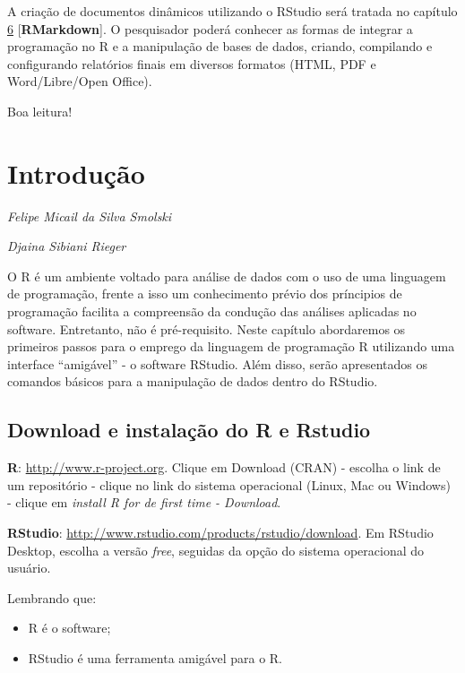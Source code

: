 \documentclass[12pt,portuguese,oneside]{book}
\providecommand{\tightlist}{%
  \setlength{\itemsep}{0pt}\setlength{\parskip}{0pt}}
\begin{document}
A criação de documentos dinâmicos utilizando o RStudio será tratada no
capítulo \protect\hyperlink{rmark}{6} {[}\textbf{RMarkdown}{]}. O
pesquisador poderá conhecer as formas de integrar a programação no R e a
manipulação de bases de dados, criando, compilando e configurando
relatórios finais em diversos formatos (HTML, PDF e Word/Libre/Open
Office).

Boa leitura!

\hypertarget{intro}{\chapter{Introdução}\label{intro}}

\emph{Felipe Micail da Silva Smolski}

\emph{Djaina Sibiani Rieger}

\begin{flushright}
\emph{}

\emph{}
\end{flushright}

O R é um ambiente voltado para análise de dados com o uso de uma
linguagem de programação, frente a isso um conhecimento prévio dos
príncipios de programação facilita a compreensão da condução das
análises aplicadas no software. Entretanto, não é pré-requisito. Neste
capítulo abordaremos os primeiros passos para o emprego da linguagem de
programação R utilizando uma interface ``amigável'' - o software
RStudio. Além disso, serão apresentados os comandos básicos para a
manipulação de dados dentro do RStudio.

\section{Download e instalação do R e
Rstudio}\label{download-e-instalacao-do-r-e-rstudio}

\textbf{R}: \url{http://www.r-project.org}. Clique em Download (CRAN) -
escolha o link de um repositório - clique no link do sistema operacional
(Linux, Mac ou Windows) - clique em \emph{install R for de first time -
Download}.

\textbf{RStudio}:
\url{http://www.rstudio.com/products/rstudio/download}. Em RStudio
Desktop, escolha a versão \emph{free}, seguidas da opção do sistema
operacional do usuário.

Lembrando que:

\begin{itemize}
\tightlist
\item
  R é o software;
\item
  RStudio é uma ferramenta amigável para o R.
\end{itemize}
\end{document}
